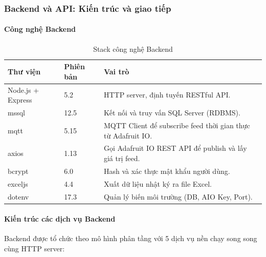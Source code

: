 \subsubsection{Backend và API: Kiến trúc và giao tiếp}

\paragraph{Công nghệ Backend}

\begin{table}[H]
\centering
\caption{Stack công nghệ Backend}
\begin{tabular}{|l|l|p{6.5cm}|}
\hline
\textbf{Thư viện} & \textbf{Phiên bản} & \textbf{Vai trò} \\ \hline
Node.js + Express & 5.2 & HTTP server, định tuyến RESTful API. \\ \hline
mssql & 12.5 & Kết nối và truy vấn SQL Server (RDBMS). \\ \hline
mqtt & 5.15 & MQTT Client để subscribe feed thời gian thực từ Adafruit IO. \\ \hline
axios & 1.13 & Gọi Adafruit IO REST API để publish và lấy giá trị feed. \\ \hline
bcrypt & 6.0 & Hash và xác thực mật khẩu người dùng. \\ \hline
exceljs & 4.4 & Xuất dữ liệu nhật ký ra file Excel. \\ \hline
dotenv & 17.3 & Quản lý biến môi trường (DB, AIO Key, Port). \\ \hline
\end{tabular}
\end{table}

\paragraph{Kiến trúc các dịch vụ Backend}

Backend được tổ chức theo mô hình phân tầng với 5 dịch vụ nền chạy song song cùng HTTP server:

